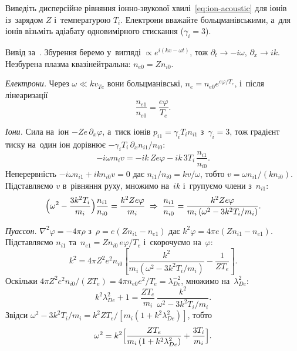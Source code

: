 \begin{problem}\label{prb:IonAcousticZ}
	Виведіть дисперсійне рівняння іонно-звукової хвилі~\eqref{eq:ion-acoustic} для іонів із~зарядом $Z$
	і~температурою $T_i$. Електрони вважайте больцманівськими, а~для іонів
	візьміть адіабату одновимірного стискання ($\gamma_i=3$).
	\begin{solution}
		Вивід за~\cite{chen2016introduction}. Збурення беремо у~вигляді $\propto e^{i(kx-\omega t)}$, тож
		$\partial_t\to-i\omega$, $\partial_x\to ik$. Незбурена плазма квазінейтральна: $n_{e0}=Zn_{i0}$.

		\emph{Електрони.} Через $\omega\ll kv_{Te}$ вони больцманівські, $n_e=n_{e0}e^{e\varphi/T_e}$, і~після
		лінеаризації
		\begin{equation*}
			\frac{n_{e1}}{n_{e0}}=\frac{e\varphi}{T_e}.
		\end{equation*}

		\emph{Іони.} Сила на~іон $-Ze\,\partial_x\varphi$, а~тиск іонів $p_{i1}=\gamma_iT_in_{i1}$ з~$\gamma_i=3$, тож
		градієнт тиску на~один іон дорівнює $-\gamma_iT_i\,\partial_xn_{i1}/n_{i0}$:
		\begin{equation*}
			-i\omega m_iv=-ik\,Ze\varphi-ik\,3T_i\,\frac{n_{i1}}{n_{i0}}.
		\end{equation*}
		Неперервність $-i\omega n_{i1}+ikn_{i0}v=0$ дає $n_{i1}/n_{i0}=kv/\omega$, тобто $v=\omega n_{i1}/(kn_{i0})$.
		Підставляємо $v$ в~рівняння руху, множимо на~$ik$ і~групуємо члени з~$n_{i1}$:
		\begin{equation*}
			\Bigl(\omega^2-\frac{3k^2T_i}{m_i}\Bigr)\frac{n_{i1}}{n_{i0}}=\frac{k^2Ze\varphi}{m_i}
			\;\Rightarrow\;
			\frac{n_{i1}}{n_{i0}}=\frac{k^2Ze\varphi}{m_i\,(\omega^2-3k^2T_i/m_i)}.
		\end{equation*}

		\emph{Пуассон.} $\nabla^2\varphi=-4\pi\rho$ з~$\rho=e(Zn_{i1}-n_{e1})$ дає $k^2\varphi=4\pi e(Zn_{i1}-n_{e1})$.
		Підставляємо $n_{i1}$ та~$n_{e1}=Zn_{i0}\,e\varphi/T_e$ і~скорочуємо на~$\varphi$:
		\begin{equation*}
			k^2=4\pi Z^2e^2n_{i0}\left[\frac{k^2}{m_i(\omega^2-3k^2T_i/m_i)}-\frac1{ZT_e}\right].
		\end{equation*}
		Оскільки $4\pi Z^2e^2n_{i0}/(ZT_e)=4\pi n_{e0}e^2/T_e=\lambda_{De}^{-2}$, множимо на~$\lambda_{De}^2$:
		\begin{equation*}
			k^2\lambda_{De}^2+1=\frac{ZT_e}{m_i}\,\frac{k^2}{\omega^2-3k^2T_i/m_i}.
		\end{equation*}
		Звідси $\omega^2-3k^2T_i/m_i=k^2ZT_e/[m_i(1+k^2\lambda_{De}^2)]$, тобто
		\begin{equation*}
			\omega^2=k^2\Bigl[\frac{ZT_e}{m_i\,(1+k^2\lambda_{De}^2)}+\frac{3T_i}{m_i}\Bigr].
		\end{equation*}
	\end{solution}
\end{problem}

